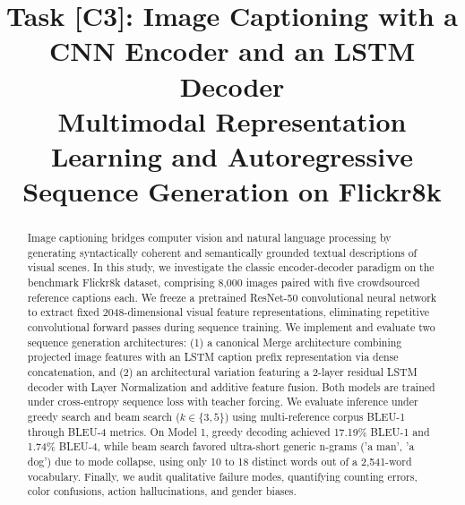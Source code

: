 \documentclass[conference]{IEEEtran}
\begin{document}
\title{Task [C3]: Image Captioning with a CNN Encoder and an LSTM Decoder\\
\large Multimodal Representation Learning and Autoregressive Sequence Generation on Flickr8k}

\author{
\and
{}
}

\maketitle

\begin{abstract}
Image captioning bridges computer vision and natural language processing by generating syntactically coherent and semantically grounded textual descriptions of visual scenes. In this study, we investigate the classic encoder-decoder paradigm on the benchmark Flickr8k dataset, comprising 8,000 images paired with five crowdsourced reference captions each. We freeze a pretrained ResNet-50 convolutional neural network to extract fixed 2048-dimensional visual feature representations, eliminating repetitive convolutional forward passes during sequence training. We implement and evaluate two sequence generation architectures: (1) a canonical Merge architecture combining projected image features with an LSTM caption prefix representation via dense concatenation, and (2) an architectural variation featuring a 2-layer residual LSTM decoder with Layer Normalization and additive feature fusion. Both models are trained under cross-entropy sequence loss with teacher forcing. We evaluate inference under greedy search and beam search ($k \in \{3, 5\}$) using multi-reference corpus BLEU-1 through BLEU-4 metrics. On Model 1, greedy decoding achieved 17.19\% BLEU-1 and 1.74\% BLEU-4, while beam search favored ultra-short generic n-grams ('a man', 'a dog') due to mode collapse, using only 10 to 18 distinct words out of a 2,541-word vocabulary. Finally, we audit qualitative failure modes, quantifying counting errors, color confusions, action hallucinations, and gender biases.
\end{abstract}
\end{document}
